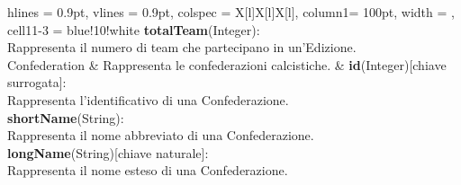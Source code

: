 \begin{tblr}{
    hlines = {0.9pt}, vlines = {0.9pt}, colspec = {X[l]X[l]X[l]}, column{1}= {100pt},
    width = \textwidth, cell{1}{1-3} = {blue!10!white}
}
{		\medskip\textbf{totalTeam}(Integer):\\Rappresenta
			il numero di team che partecipano in un'Edizione.
	}
	\\
	{
		Confederation
	}
	&
	{
	Rappresenta le confederazioni calcistiche.
	}
	& 
	{
		\textbf{id}(Integer)[chiave surrogata]:\\Rappresenta
			l'identificativo di una Confederazione.\\
		\medskip\textbf{shortName}(String):\\Rappresenta
			il nome abbreviato di una Confederazione.\\
		\medskip\textbf{longName}(String)[chiave naturale]:
			\\Rappresenta il nome esteso di una Confederazione.
	}
	\\
\end{tblr}

\newpage


